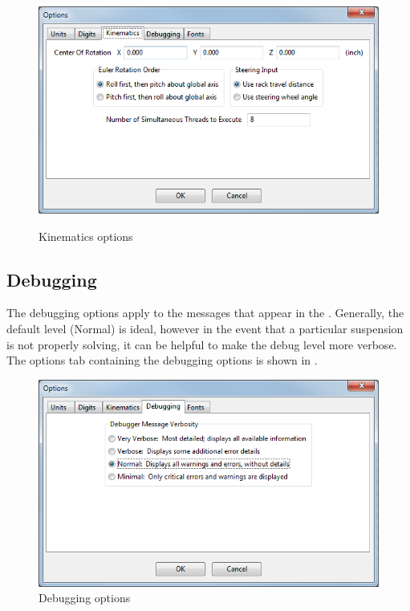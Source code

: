 \begin{figure}
  \includegraphics[width=\textwidth]{images/optionsKinematics} \label{fig:optionsKinematics}
  \caption{Kinematics options}
  \centering
\end{figure}

\subsection{Debugging} \label{ssec:optionsDebugging}

The debugging options apply to the messages that appear in the .  Generally, the default level (Normal) is ideal, however in the event that a particular suspension is not properly solving, it can be helpful to make the debug level more verbose.  The options tab containing the debugging options is shown in .

\begin{figure}
  \includegraphics[width=\textwidth]{images/optionsDebugging}
  \caption{Debugging options} \label{fig:optionsDebugging}
  \centering
\end{figure}

